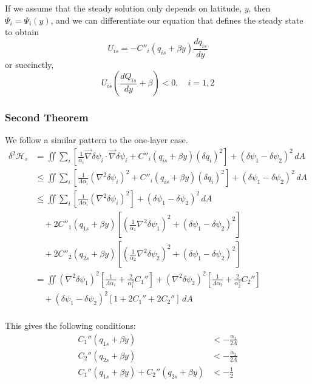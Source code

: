 \documentclass[12pt]{article}
\begin{document}
{{{            If we assume that the steady solution only depends on latitude, $y$, then $\Psi_i = \Psi_i(y)$, and we can differentiate our equation that defines the steady state to obtain
            $$
            U_{is} = -C''_i(q_{is} + \beta y) \frac{dq_{is}}{dy}
            $$
            or succinctly,
            $$
            U_{is} \left(\frac{d Q_{is}}{dy} + \beta \right) < 0, \quad i=1,2
            $$
        }
        \subsubsection{Second Theorem}{
            We follow a similar pattern to the one-layer case.
            \begin{align*}
                \delta^2\mathcal{H}_s
                &= \iint \sum_i \left[ \frac{1}{\alpha_i} \vec\nabla\delta\psi_i \cdot \vec\nabla\delta\psi_i + C''_i(q_{is} + \beta y) (\delta q_i)^2 \right]+ (\delta\psi_1 - \delta\psi_2)^2 \, dA \\
                &\le \iint \sum_i \left[ \frac{1}{\Lambda\alpha_i} (\nabla^2\delta\psi_i)^2 + C''_i(q_{is} + \beta y) (\delta q_i)^2 \right]+ (\delta\psi_1 - \delta\psi_2)^2 \, dA \\
                &\le \iint \sum_i \left[ \frac{1}{\Lambda\alpha_i} (\nabla^2\delta\psi_i)^2 \right]+ (\delta\psi_1 - \delta\psi_2)^2 \, dA \\
                &\quad + 2C''_1(q_{1s} + \beta y) \left[ \left(\frac{1}{\alpha_1} \nabla^2\delta\psi_1 \right)^2 + (\delta\psi_1 - \delta\psi_2)^2 \right] \\
                &\quad + 2C''_2(q_{2s} + \beta y) \left[ \left(\frac{1}{\alpha_2} \nabla^2\delta\psi_2 \right)^2 + (\delta\psi_1 - \delta\psi_2)^2 \right] \\
                &= \iint (\nabla^2\delta\psi_1)^2\left[ \frac{1}{\Lambda\alpha_1} + \frac{2}{\alpha_1^2}C_1'' \right] + (\nabla^2\delta\psi_2)^2\left[ \frac{1}{\Lambda\alpha_2} + \frac{2}{\alpha_2^2}C_2'' \right] \\
                &\quad + (\delta\psi_1-\delta\psi_2)^2[1+2C_1'' + 2C_2''] \, dA \\
            \end{align*}            
            
            This gives the following conditions:
            \begin{align*}
                C_1''(q_{1s} + \beta y) &< -\frac{\alpha_1}{2\Lambda} \\
                C_2''(q_{2s} + \beta y) &< -\frac{\alpha_2}{2\Lambda} \\
                C_1''(q_{1s} + \beta y) + C_2''(q_{2s} + \beta y) &< -\frac12
            \end{align*}
        }
    }

}
\end{document}
